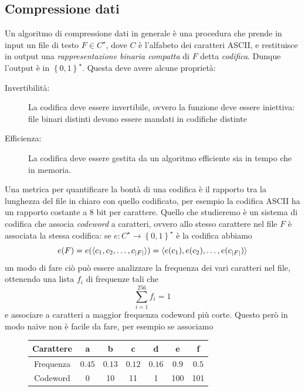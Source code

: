 \documentclass[11pt]{scrartcl}
\begin{document}
	\subsection{Compressione dati}
	Un algoritmo di compressione dati in generale è una procedura che prende in input un file di testo $F\in C^\star$, dove $C$ è l'alfabeto dei caratteri ASCII, e restituisce in output una \textit{rappresentazione binaria compatta} di $F$ detta \textit{codifica}. Dunque l'output è in $\left\{0,1\right\}^\star$. Questa deve avere alcune proprietà:
	\begin{description}
		\item[Invertibilità:] La codifica deve essere invertibile, ovvero la funzione deve essere iniettiva: file binari distinti devono essere mandati in codifiche distinte
		\item[Efficienza:] La codifica deve essere gestita da un algoritmo efficiente sia in tempo che in memoria.
	\end{description}
	Una metrica per quantificare la bontà di una codifica è il rapporto tra la lunghezza del file in chiaro con quello codificato, per esempio la codifica ASCII ha un rapporto costante a $8$ bit per carattere. Quello che studieremo è un sistema di codifica che associa \textit{codeword} a caratteri, ovvero allo stesso carattere nel file $F$ è associata la stessa codifica: se $e:C^\star\to \left\{0,1\right\}^\star$ è la codifica abbiamo
	$$e(F)=e(\langle c_1,c_2,\dots,c_{\left\lvert F \right\rvert}\rangle)=\langle e(c_1),e(c_2),\dots,e(c_{\left\lvert F \right\rvert})\rangle$$
	un modo di fare ciò può essere analizzare la frequenza dei vari caratteri nel file, ottenendo una lista $f_i$ di frequenze tali che
	$$\sum_{i=1}^{256}f_i=1$$
	e associare a caratteri a maggior frequenza codeword più corte. Questo però in modo na\"ive non è facile da fare, per esempio se associamo
		\begin{figure}[h]
			\begin{center}
				\begin{tabular}{ccccccc}
					Carattere & a & b & c & d & e & f \\
					\hline 
					Frequenza & $0.45$ & $0.13$ & $0.12$ & $0.16$ & $0.9$ & $0.5$\\
					\hline
					Codeword & 0 & 10 & 11 & 1 & 100 & 101 
				\end{tabular}
			\end{center}
		\end{figure}
	
	
	
\end{document}
